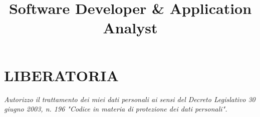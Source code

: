 \documentclass[10pt,a4paper,sans]{moderncv}
\title{Software Developer \& Application Analyst}
\begin{document}
\makecvtitle













\section{LIBERATORIA}
\textit{Autorizzo il trattamento dei miei dati personali ai sensi del Decreto
Legislativo 30 giugno 2003, n. 196 "Codice in materia di protezione dei dati personali".}
\end{document}
